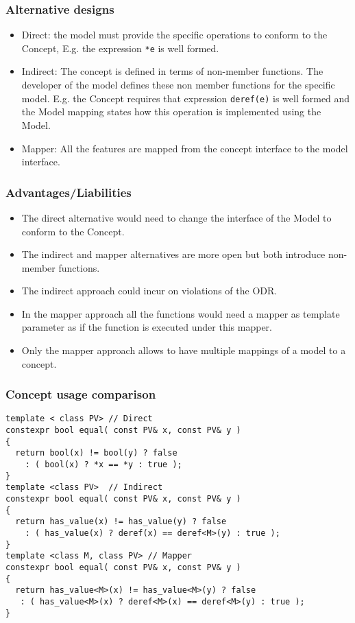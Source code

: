 \documentclass[xcolor=dvipsnames]{beamer}
\newcommand{\cpp}[1]{\lstinline{#1}}
\begin{document}
\begin{frame}[fragile]
\frametitle{Alternative designs}

\begin{itemize}
  \item Direct: the model must provide the specific operations to conform to the Concept, E.g. the expression \cpp{*e} is well formed.
  \item Indirect: The concept is defined in terms of non-member functions. The developer of the model defines these non member functions for the specific model. E.g. the Concept requires that expression \cpp{deref(e)} is well formed and the Model mapping states how this operation is implemented using the Model.
  \item Mapper: All the features are mapped from the concept interface to the model interface. 
\end{itemize}
\end{frame}
\begin{frame}[fragile]
\frametitle{Advantages/Liabilities}

\begin{itemize}
  \item The direct alternative would need to change the interface of the Model to conform to the Concept.
  \item The indirect and mapper alternatives are more open but both introduce non-member functions. 
  \item The indirect approach could incur on violations of the ODR.  
  \item In the mapper approach all the functions would need a mapper as template parameter as if the function is executed under this mapper.
  \item Only the mapper approach allows to have multiple mappings of a model to a concept.  
  
\end{itemize}

\end{frame}
\begin{frame}[fragile]
\frametitle{Concept usage comparison}

\begin{lstlisting}
template < class PV> // Direct
constexpr bool equal( const PV& x, const PV& y ) 
{
  return bool(x) != bool(y) ? false 
    : ( bool(x) ? *x == *y : true );
}
template <class PV>  // Indirect
constexpr bool equal( const PV& x, const PV& y ) 
{
  return has_value(x) != has_value(y) ? false 
    : ( has_value(x) ? deref(x) == deref<M>(y) : true );
}
template <class M, class PV> // Mapper
constexpr bool equal( const PV& x, const PV& y ) 
{
  return has_value<M>(x) != has_value<M>(y) ? false 
   : ( has_value<M>(x) ? deref<M>(x) == deref<M>(y) : true );
}
\end{lstlisting}

\end{frame}
\end{document}
